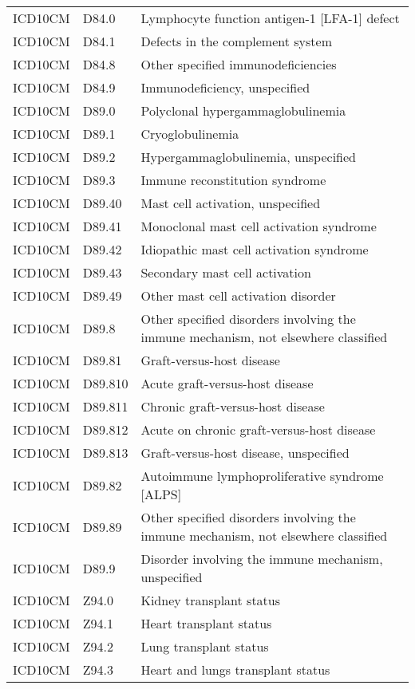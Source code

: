 \begin{longtable}{p{}p{}p{}}
  ICD10CM & D84.0 & Lymphocyte function antigen-1 [LFA-1] defect \\ 
  ICD10CM & D84.1 & Defects in the complement system \\ 
  ICD10CM & D84.8 & Other specified immunodeficiencies \\ 
  ICD10CM & D84.9 & Immunodeficiency, unspecified \\ 
  ICD10CM & D89.0 & Polyclonal hypergammaglobulinemia \\ 
  ICD10CM & D89.1 & Cryoglobulinemia \\ 
  ICD10CM & D89.2 & Hypergammaglobulinemia, unspecified \\ 
  ICD10CM & D89.3 & Immune reconstitution syndrome \\ 
  ICD10CM & D89.40 & Mast cell activation, unspecified \\ 
  ICD10CM & D89.41 & Monoclonal mast cell activation syndrome \\ 
  ICD10CM & D89.42 & Idiopathic mast cell activation syndrome \\ 
  ICD10CM & D89.43 & Secondary mast cell activation \\ 
  ICD10CM & D89.49 & Other mast cell activation disorder \\ 
  ICD10CM & D89.8 & Other specified disorders involving the immune mechanism, not elsewhere classified \\ 
  ICD10CM & D89.81 & Graft-versus-host disease \\ 
  ICD10CM & D89.810 & Acute graft-versus-host disease \\ 
  ICD10CM & D89.811 & Chronic graft-versus-host disease \\ 
  ICD10CM & D89.812 & Acute on chronic graft-versus-host disease \\ 
  ICD10CM & D89.813 & Graft-versus-host disease, unspecified \\ 
  ICD10CM & D89.82 & Autoimmune lymphoproliferative syndrome [ALPS] \\ 
  ICD10CM & D89.89 & Other specified disorders involving the immune mechanism, not elsewhere classified \\ 
  ICD10CM & D89.9 & Disorder involving the immune mechanism, unspecified \\ 
  ICD10CM & Z94.0 & Kidney transplant status \\ 
  ICD10CM & Z94.1 & Heart transplant status \\ 
  ICD10CM & Z94.2 & Lung transplant status \\ 
  ICD10CM & Z94.3 & Heart and lungs transplant status \\ 

\end{longtable}
